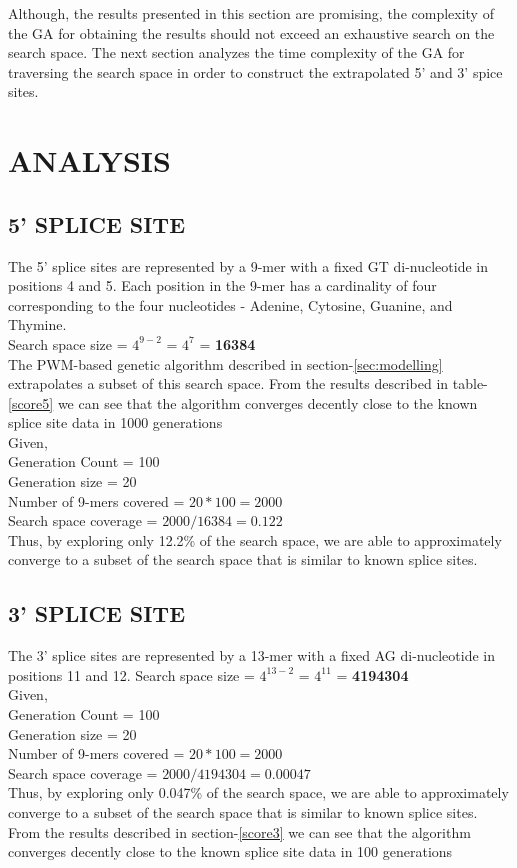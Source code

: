 \documentclass[12pt,a4paper]{article}
\begin{document}
	Although, the results presented in this section are promising, the complexity of the GA for obtaining the results should not exceed an exhaustive search on the search space. The next section analyzes the time complexity of the GA for traversing the search space in order to construct the extrapolated 5' and 3' spice sites. 
	
	\section{ANALYSIS} \label{sec-analysis}
	\subsection{5' SPLICE SITE}
	The 5' splice sites are represented by a 9-mer with a fixed GT di-nucleotide in positions 4 and 5. Each position in the 9-mer has a cardinality of four corresponding to the four nucleotides - Adenine, Cytosine, Guanine, and Thymine. \\
	Search space size = $4^{9-2}$ = $4^7$ = \textbf{16384} \\
	The PWM-based genetic algorithm described in section-\ref{sec:modelling} extrapolates a subset of this search space. From the results described in table-\ref{score5} we can see that the algorithm converges decently close to the known splice site data in 1000 generations\\
	Given, \\
	Generation Count = 100 \\
	Generation size = 20 \\
	Number of 9-mers covered = $20 * 100 = 2000 $\\
	Search space coverage = $2000 / 16384 = 0.122$ \\
	Thus, by exploring only 12.2\% of the search space, we are able to approximately converge to a subset of the search space that is similar to known splice sites.

	\subsection{3' SPLICE SITE}
	The 3' splice sites are represented by a 13-mer with a fixed AG di-nucleotide in positions 11 and 12.
	Search space size = $4^{13-2}$ = $4^11$ = \textbf{4194304} \\
	Given, \\
	Generation Count = 100 \\
	Generation size = 20 \\
	Number of 9-mers covered = $20 * 100 = 2000 $\\
	Search space coverage = $2000 / 4194304 = 0.00047$ \\
	Thus, by exploring only 0.047\% of the search space, we are able to approximately converge to a subset of the search space that is similar to known splice sites.
	From the results described in section-\ref{score3} we can see that the algorithm converges decently close to the known splice site data in 100 generations\par
\end{document}
